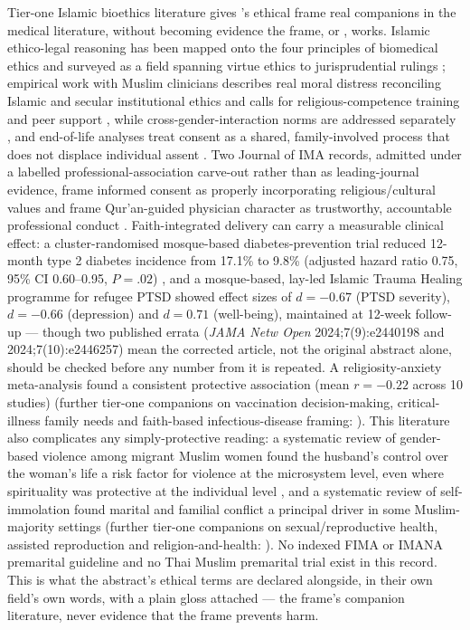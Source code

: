 Tier-one Islamic bioethics literature gives \tphe{}'s ethical frame real companions in the medical literature, without becoming evidence the frame, or \tphe{}, works. Islamic ethico-legal reasoning has been mapped onto the four principles of biomedical ethics \cite{ref225} and surveyed as a field spanning virtue ethics to jurisprudential rulings \cite{ref228,ref230}; empirical work with Muslim clinicians describes real moral distress reconciling Islamic and secular institutional ethics and calls for religious-competence training and peer support \cite{ref227}, while cross-gender-interaction norms are addressed separately \cite{ref226}, and end-of-life analyses treat consent as a shared, family-involved process that does not displace individual assent \cite{ref229}. Two Journal of IMA records, admitted under a labelled professional-association carve-out rather than as leading-journal evidence, frame informed consent as properly incorporating religious/cultural values \cite{ref241} and frame Qur'an-guided physician character as trustworthy, accountable professional conduct \cite{ref242}. Faith-integrated delivery can carry a measurable clinical effect: a cluster-randomised mosque-based diabetes-prevention trial reduced 12-month type 2 diabetes incidence from 17.1\% to 9.8\% (adjusted hazard ratio 0.75, 95\% CI 0.60--0.95, $P=.02$) \cite{ref231}, and a mosque-based, lay-led Islamic Trauma Healing programme for refugee PTSD showed effect sizes of $d=-0.67$ (PTSD severity), $d=-0.66$ (depression) and $d=0.71$ (well-being), maintained at 12-week follow-up \cite{ref232} --- though two published errata (\emph{JAMA Netw Open} 2024;7(9):e2440198 and 2024;7(10):e2446257) mean the corrected article, not the original abstract alone, should be checked before any number from it is repeated. A religiosity-anxiety meta-analysis found a consistent protective association (mean $r=-0.22$ across 10 studies) \cite{ref238} (further tier-one companions on vaccination decision-making, critical-illness family needs and faith-based infectious-disease framing: \cite{ref233,ref234,ref243}). This literature also complicates any simply-protective reading: a systematic review of gender-based violence among migrant Muslim women found the husband's control over the woman's life a risk factor for violence at the microsystem level, even where spirituality was protective at the individual level \cite{ref235}, and a systematic review of self-immolation found marital and familial conflict a principal driver in some Muslim-majority settings \cite{ref239} (further tier-one companions on sexual/reproductive health, assisted reproduction and religion-and-health: \cite{ref236,ref237,ref240}). No indexed FIMA or IMANA premarital guideline and no Thai Muslim premarital trial exist in this record. This is what the abstract's ethical terms are declared alongside, in their own field's own words, with a plain gloss attached --- the frame's companion literature, never evidence that the frame prevents harm.

